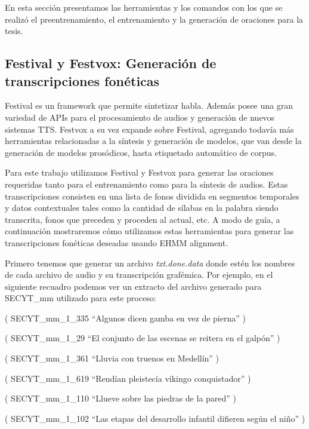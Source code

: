 En esta sección presentamos las herramientas y los comandos con los que se realizó el preentrenamiento, el entrenamiento y la generación de oraciones para la tesis.

\subsection{Festival y Festvox: Generación de transcripciones fonéticas}

Festival \cite{festivalDownload} es un framework que permite sintetizar habla. Además posee una gran variedad de APIs para el procesamiento de audios y generación de nuevos sistemas TTS. Festvox \cite{festvoxDownload} a su vez expande sobre Festival, agregando todavía más herramientas relacionadas a la síntesis y generación de modelos, que van desde la generación de modelos prosódicos, hasta etiquetado automático de corpus.

Para este trabajo utilizamos Festival y Festvox para generar las oraciones requeridas tanto para el entrenamiento como para la síntesis de audios. Estas transcripciones consisten en una lista de fonos dividida en segmentos temporales y datos contextuales tales como la cantidad de sílabas en la palabra siendo transcrita, fonos que preceden y proceden al actual, etc. A modo de guía, a continuación mostraremos cómo utilizamos estas herramientas para generar las transcripciones fonéticas deseadas usando EHMM alignment.

Primero tenemos que generar un archivo \textit{txt.done.data} donde estén los nombres de cada archivo de audio y su transcripción grafémica. Por ejemplo, en el siguiente recuadro podemos ver un extracto del archivo generado para SECYT\_mm utilizado para este proceso:

\begin{tcolorbox}
( SECYT\_mm\_1\_335 ``Algunos dicen gamba en vez de pierna'' )

( SECYT\_mm\_1\_29 ``El conjunto de las escenas se reitera en el galpón'' )

( SECYT\_mm\_1\_361 ``Lluvia con truenos en Medellín'' )

( SECYT\_mm\_1\_619 ``Rendían pleistecía vikingo conquistador'' )

( SECYT\_mm\_1\_110 ``Llueve sobre las piedras de la pared'' )

( SECYT\_mm\_1\_102 ``Las etapas del desarrollo infantil difieren según el niño'' )

\end{tcolorbox}

